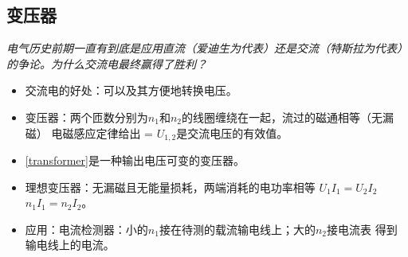 \documentclass[a4paper,9pt]{ctexart}
\begin{document}
\subsection{变压器}
\emph{电气历史前期一直有到底是应用直流（爱迪生为代表）还是交流（特斯拉为代表）的争论。为什么交流电最终赢得了胜利？}
\begin{itemize}
\item
交流电的好处：可以及其方便地转换电压。
\item
变压器：两个匝数分别为$n_1$和$n_2$的线圈缠绕在一起，流过的磁通相等（无漏磁） \so 电磁感应定律给出
\beq
{} = 
\eeq
$U_{1,2}$是交流电压的有效值。
\item
\cref{transformer}是一种输出电压可变的变压器。
\item
理想变压器：无漏磁且无能量损耗，两端消耗的电功率相等 \so $U_1 I_1 = U_2 I_2$ \so $n_1 I_1 = n_2 I_2$。
\item
应用：电流检测器：小的$n_1$接在待测的载流输电线上；大的$n_2$接电流表 \so 得到输电线上的电流。
\end{itemize}
\end{document}
